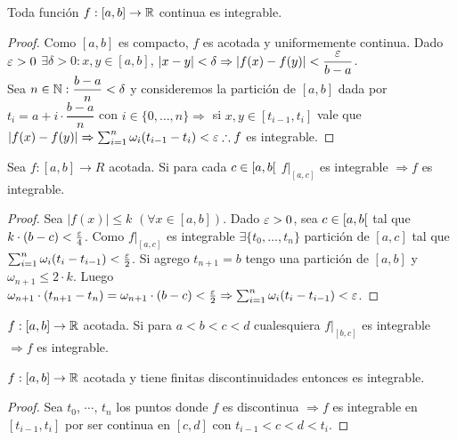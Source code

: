 \clearpage

\begin{theorem}
  Toda función \(f : [a, b] \to \mathbb{R} \) continua es integrable.
  \begin{proof}
    Como \([a, b]\) es compacto, \(f\) es acotada y uniformemente continua. Dado \(\varepsilon > 0\) \(\exists \delta > 0 : x, y \in [a, b]\), \(|x-y| < \delta \Rightarrow |f(x) - f(y)| < \dfrac{\varepsilon}{b-a} \). \\
    Sea \(n \in \mathbb{N} : \dfrac{b-a}{n} < \delta \) y consideremos la partición de \([a, b]\) dada por \(t_i = a + i \cdot \dfrac{b-a}{n} \) con \(i \in \{0, \ldots, n\} \Rightarrow \) si \(x, y \in [t_{i-1}, t_i]\) vale que \(|f(x) - f(y)| \Rightarrow \sum_{i=1}^n \omega_i (t_{i-1} - t_i) < \varepsilon \therefore f\) es integrable.
  \end{proof}
\end{theorem}

\begin{theorem}
  Sea \(f: [a, b] \to R\) acotada. Si para cada \(c \in \interval[open right]{a}{b}\) \(f|_{[a, c]} \) es integrable \(\Rightarrow f\) es integrable.
  \begin{proof}
    Sea \(|f(x)| \leq k\) \((\forall x \in [a,b])\). Dado \(\varepsilon > 0\), sea \(c \in \interval[open right]{a}{b}\) tal que \(k \cdot (b-c) < \frac{\varepsilon}{4} \). Como \( f|_{[a, c]} \) es integrable \(\exists \{t_0, \ldots, t_n\} \) partición de \([a, c]\) tal que \(\sum_{i = 1}^n \omega_i (t_i - t_{i-1}) < \frac{\varepsilon}{2} \). Si agrego \(t_{n+1} = b\) tengo una partición de \([a, b]\) y \(\omega_{n+1} \leq 2 \cdot k\). Luego \(\omega_{n+1} \cdot (t_{n+1} - t_n) = \omega_{n+1} \cdot (b-c) < \frac{\varepsilon}{2} \Rightarrow \sum_{i = 1}^n \omega_i (t_i - t_{i-1}) < \varepsilon \).
  \end{proof}
\end{theorem}

\begin{corollary}
  \(f: [a, b] \to \mathbb{R} \) acotada. Si para \(a < b < c < d\) cualesquiera \(f|_{[b, c]} \) es integrable \(\Rightarrow f\) es integrable.
\end{corollary}

\begin{corollary}
  \(f: [a, b] \to \mathbb{R} \) acotada y tiene finitas discontinuidades entonces es integrable.
  \begin{proof}
    Sea \(t_0\), \(\cdots \), \(t_n\) los puntos donde \(f\) es discontinua \(\Rightarrow f\) es integrable en \([t_{i-1}, t_i]\) por ser continua en \([c, d]\) con \(t_{i-1} < c < d < t_i\).
  \end{proof}
\end{corollary}


